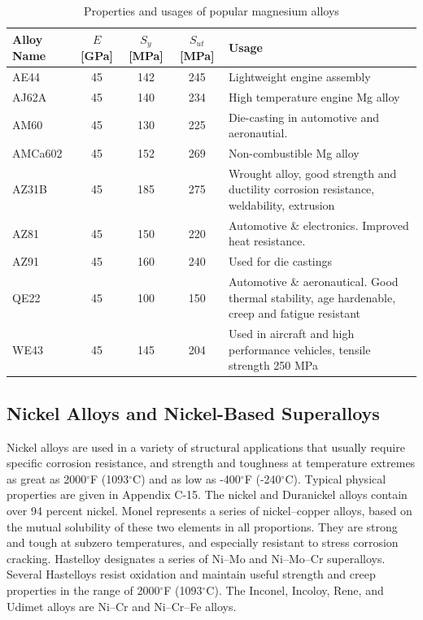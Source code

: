 \documentclass[
10pt,
a4paper,
openany,
svgnames,
]{book}
\begin{document}
\begin{table}[h]
  \centering
  \caption{Properties and usages of popular magnesium alloys}
  {\renewcommand{\arraystretch}{1.4}
  \begin{tabular}{lcccL{7cm}}
    \toprule
    Alloy Name & $E$ [GPa]  & $S_y$ [MPa] & $S_{ut}$ [MPa] &  Usage \\
    \midrule
    AE44       & 45 & 142 & 245    & Lightweight engine assembly \\
    AJ62A      & 45 & 140 & 234    & High temperature engine Mg alloy                                                             \\
    AM60       & 45 & 130 & 225    & Die-casting in automotive and aeronautial.                                                                                            \\
    AMCa602    & 45 & 152 & 269    & Non-combustible Mg alloy                                                                     \\
    AZ31B      & 45 & 185 & 275    & Wrought alloy, good strength and ductility corrosion resistance, weldability, extrusion      \\
    AZ81       & 45 & 150 & 220    & Automotive \& electronics. Improved heat resistance.                                          \\
    AZ91    & 45 & 160 & 240 & Used for die castings                                                                        \\
    QE22    & 45 & 100 & 150  & Automotive \& aeronautical. Good thermal stability, age hardenable, creep and fatigue resistant \\
    WE43    & 45 & 145  & 204 & Used in aircraft and high performance vehicles, tensile strength 250 MPa              \\
    \bottomrule                     
  \end{tabular}}
\end{table}

\subsection{Nickel Alloys and Nickel-Based Superalloys}

Nickel alloys are used in a variety of structural applications that usually require specific corrosion resistance, and strength and toughness at temperature extremes as great as 2000$^{\circ}$F (1093$^{\circ}$C) and as low as -400$^{\circ}$F (-240$^{\circ}$C). Typical physical properties are given in Appendix C-15. The nickel and Duranickel alloys contain over 94 percent nickel. Monel represents a series of nickel–copper alloys, based on the mutual solubility of these two elements in all proportions. They are strong and tough at subzero temperatures, and especially resistant to stress corrosion cracking. Hastelloy designates a series of Ni–Mo and Ni–Mo–Cr superalloys. Several Hastelloys resist oxidation and maintain useful strength and creep properties in the range of 2000$^{\circ}$F (1093$^{\circ}$C). The Inconel, Incoloy, Rene, and Udimet alloys are Ni–Cr and Ni–Cr–Fe alloys. 
\end{document}
